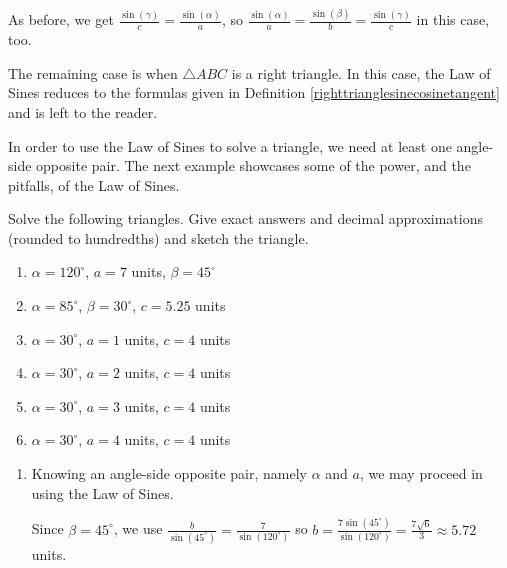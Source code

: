 \documentclass{ximera}
\begin{document}
  
 
As before, we get  $\frac{\sin(\gamma)}{c} = \frac{\sin(\alpha)}{a}$, so  $ \frac{\sin(\alpha)}{a} = \frac{\sin(\beta)}{b} = \frac{\sin(\gamma)}{c}$ in this case, too.


The remaining case is when $\triangle ABC$ is a right triangle.  In this case, the Law of Sines reduces to the formulas given in Definition  \ref{righttrianglesinecosinetangent} and is left to the reader.  

 

In order to use the Law of Sines to solve a triangle, we need at least one angle-side opposite pair.  The next example showcases some of the power, and the pitfalls, of the Law of Sines.

 

\begin{example}  \label{losex} Solve the following triangles.  Give exact answers and decimal approximations (rounded to hundredths) and sketch the triangle.

\begin{enumerate}

\item  \label{losaas} $\alpha = 120^{\circ}$, $a = 7$ units, $\beta = 45^{\circ}$
\item  \label{losasa} $\alpha = 85^{\circ}$, $\beta = 30^{\circ}$, $c = 5.25$ units



\item  \label{losnotriangleex} $\alpha = 30^{\circ}$, $a=1$ units, $c = 4$ units
\item  \label{losrighttriangleex} $\alpha = 30^{\circ}$, $a=2$ units, $c = 4$ units


\item  \label{lostwotriangleex} $\alpha = 30^{\circ}$, $a=3$ units, $c = 4$ units
\item  \label{losonetriangleex} $\alpha = 30^{\circ}$, $a=4$ units, $c = 4$ units

\end{enumerate}

\begin{explanation}

\begin{enumerate}

\item Knowing an angle-side opposite pair, namely $\alpha$ and $a$, we may proceed in using the Law of Sines.  

 

Since $\beta = 45^{\circ}$, we use $\frac{b}{\sin\left(45^{\circ}\right)} = \frac{7}{\sin\left(120^{\circ}\right)}$ so $b = \frac{7\sin\left(45^{\circ}\right)}{\sin\left(120^{\circ}\right)} = \frac{7\sqrt{6}}{3} \approx 5.72$ units.  


\end{enumerate}
\end{explanation}
\end{example}
\end{document}
